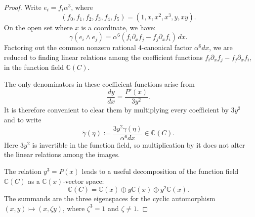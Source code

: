 \documentclass[10pt,a4paper]{amsart}
\begin{document}
\begin{proof}
Write $e_i=f_i\alpha^3$, where
\[
(f_0,f_1,f_2,f_3,f_4,f_5)=(1,x,x^2,x^3,y,xy).
\]
On the open set where $x$ is a coordinate, we have:
\[
{\gamma(e_i\wedge e_j)
=\alpha^6(f_i\partial_xf_j-f_j\partial_xf_i)\,dx.}
\]
Factoring out the common nonzero rational $4$-canonical factor
$\alpha^6 dx$, we are reduced to finding linear relations among the coefficient functions
$f_i\partial_xf_j-f_j\partial_xf_i$, in the function field $\mathbb C(C)$.

The only denominators in these coefficient functions arise from
\[
\frac{dy}{dx}=\frac{P'(x)}{3y^2}.
\]
It is therefore convenient to clear them by multiplying every coefficient
by $3y^2$ and to write
\begin{equation*}
{\widetilde\gamma(\eta):=\frac{3y^2\gamma(\eta)}{\alpha^6dx}\in\mathbb C(C).}
\end{equation*}
Here $3y^2$ is invertible in the function field,
so multiplication by it does not alter the linear relations among the images.

The relation $y^3=P(x)$ leads to a useful decomposition of
the function field $\mathbb C(C)$ as a $\mathbb C(x)$-vector space:
\begin{equation}
\label{eq:function-field-cyclic-decomposition}
\mathbb C(C)
=
\mathbb C(x)\oplus y\mathbb C(x)\oplus y^2\mathbb C(x).
\end{equation}
The summands are the three eigenspaces for the cyclic automorphism
$(x,y)\mapsto(x,\zeta y)$, where $\zeta^3=1$ {and $\zeta\neq1$}.



\end{proof}
\end{document}
